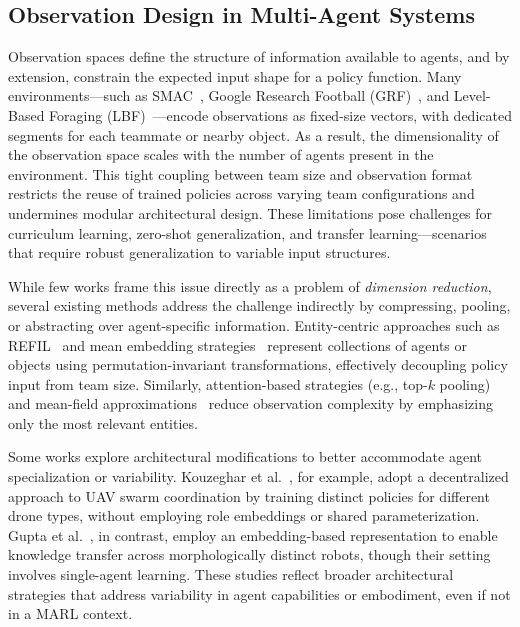 \subsection{Observation Design in Multi-Agent Systems}
\label{sec:related_work-observation_design}

Observation spaces define the structure of information available to agents, 
and by extension, constrain the expected input shape for a policy function.
Many environments—such as SMAC~\cite{samvelyan2019}, 
Google Research Football (GRF)~\cite{kurach2020}, 
and Level-Based Foraging (LBF)~\cite{papoudakis2021}—encode observations as fixed-size vectors, 
with dedicated segments for each teammate or nearby object. 
As a result, the dimensionality of the observation space scales with the 
number of agents present in the environment. 
This tight coupling between team size and observation format restricts the 
reuse of trained policies across varying team configurations and undermines 
modular architectural design. These limitations pose challenges for curriculum learning, 
zero-shot generalization, and transfer learning—scenarios that require robust generalization 
to variable input structures.

While few works frame this issue directly as a problem of \textit{dimension reduction}, 
several existing methods address the challenge indirectly by compressing, pooling, 
or abstracting over agent-specific information. Entity-centric approaches such as 
REFIL~\cite{iqbal2021} and mean embedding strategies~\cite{huttenrauch2019} represent 
collections of agents or objects using permutation-invariant transformations, effectively 
decoupling policy input from team size. Similarly, attention-based strategies 
(e.g., top-$k$ pooling) and mean-field approximations~\cite{yang2021a} reduce 
observation complexity by emphasizing only the most relevant entities.

Some works explore architectural modifications to better accommodate agent specialization 
or variability. Kouzeghar et al.~\cite{kouzeghar2023}, for example, adopt a decentralized 
approach to UAV swarm coordination by training distinct policies for different drone types, 
without employing role embeddings or shared parameterization. 
Gupta et al.~\cite{gupta2017a}, in contrast, employ an embedding-based representation to 
enable knowledge transfer across morphologically distinct robots, though their setting 
involves single-agent learning. These studies reflect broader architectural strategies that 
address variability in agent capabilities or embodiment, even if not in a MARL context.

